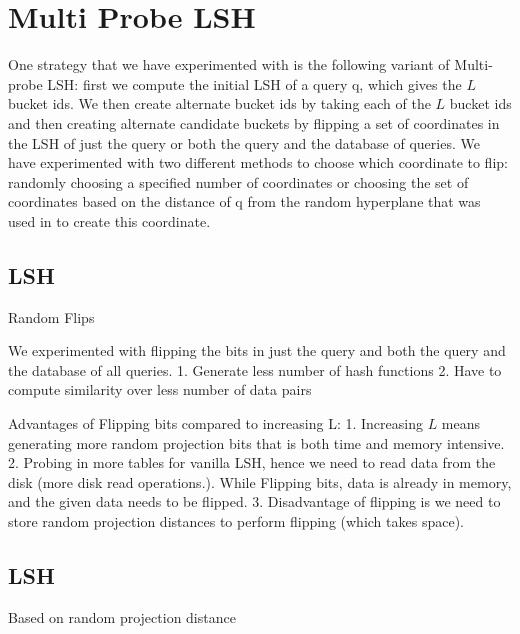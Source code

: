 \section{Multi Probe LSH}

One strategy that we have experimented with is the following variant of Multi-probe LSH:  first we compute the initial LSH of a query q, which gives the $L$ bucket ids. We then create alternate bucket ids by taking each of the $L$ bucket ids and then creating alternate candidate buckets by flipping a set of coordinates in the LSH of just the query or both the query and the database of queries. We have experimented with two different methods to choose which coordinate to flip: randomly choosing a specified number of coordinates or choosing the set of coordinates based on the distance of q from the random hyperplane that was used in to create this coordinate.  
\subsection{\rflip LSH}
Random Flips

We experimented with flipping the bits in just the query and both the query and the database of all queries.  
1. Generate less number of hash functions
2. Have to compute similarity over less number of data pairs

Advantages of Flipping bits compared to increasing L:
1. Increasing $L$ means generating more random projection bits that is both time and memory intensive.   
2. Probing in more tables for vanilla LSH, hence we need to read data from the disk (more disk read operations.). While Flipping bits, data is
already in memory, and the given data needs to be flipped.
3. Disadvantage of flipping is we need to store random projection distances to perform flipping (which takes space).


\subsection{\dflip LSH}
Based on random projection distance 
